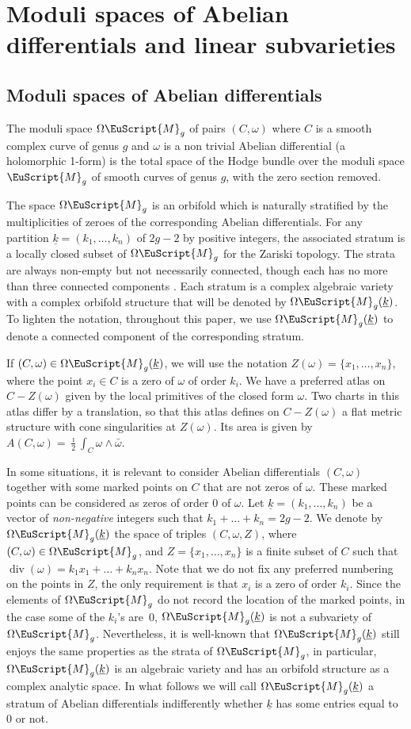 \documentclass[10pt]{amsart}
\let\mathcal\EuScript
\DeclareMathOperator{\Div}{div}
\theoremstyle{plain}
\theoremstyle{definition}
\newcommand{\Mcal}{\mathcal{M}}
\newcommand{\cM}{\mathcal{M}}
\let\omg\omega
\let\ul\underline
\newcommand{\trate}{\Omega\Mcal_{g}(\ul{k})}
\newcommand{\htrate}{\Omega\Mcal_{g}}
\begin{document}
\section{Moduli spaces of Abelian differentials and linear subvarieties}\label{sec:strate:n:lin:subvar}
\subsection{Moduli spaces of Abelian differentials}\label{subsec:strate:abel}
The moduli space $\htrate$ of pairs $(C, \omega)$ where $C$ is a smooth complex curve of genus $g$ and $\omega$ is a non trivial Abelian differential (\ie a holomorphic 1-form) is the total space of the Hodge bundle over the moduli space $\cM_g$ of smooth curves of genus $g$, with the zero section removed.

The space $\htrate$ is an orbifold which is naturally stratified by the multiplicities of zeroes of the corresponding Abelian differentials. For any partition $\underline k=(k_1,\dots,k_n)$ of $ 2g - 2$ by positive integers, the associated stratum is a locally closed subset of $\htrate$ for the Zariski topology. The strata are always non-empty but not necessarily connected, though each has no more than three connected components \cite{KZ03}. Each stratum is a complex algebraic variety with a complex orbifold structure that will be denoted by $\trate$. To lighten the notation, throughout this paper, we use $\trate$ to denote a connected component of the corresponding stratum.

If $(C,\omega)\in\trate$, we will use the notation $Z(\omega)=\{x_1,\dots,x_n\}$, where the point $x_i\in C$ is a zero of $\omega$ of order $k_i$. We have a preferred atlas on $C - Z(\omega)$ given by the local primitives of the closed form $\omega$. Two charts in this atlas differ by a translation, so that this atlas defines on $C - Z(\omega)$ a flat metric structure with cone singularities at $Z(\omega)$. Its area is given by $A(C, \omega) = \frac{\imath}{2} \int_C \omega \wedge \bar \omega$.

In some situations, it is relevant to consider Abelian differentials $(C,\omg)$ together with some marked points on $C$ that are not zeros of $\omg$. These marked points can be considered as zeros of order $0$ of $\omg$. Let $\ul{k}=(k_1,\dots,k_n)$ be a vector of \emph{non-negative} integers such that $k_1+\dots+k_n=2g-2$. We denote by $\trate$ the space of triples $(C,\omg,Z)$, where $(C,\omg)\in \htrate$, and $Z=\{x_1,\dots,x_n\}$ is a finite subset of $C$ such that $\Div(\omg)=k_1x_1+\dots+k_nx_n$. Note that we do not fix any preferred numbering on the points in $Z$, the only requirement is that $x_i$ is a zero of order $k_i$.
Since the elements of $\htrate$ do not record the location of the marked points, in the case some of the $k_i$'s are~$0$, $\trate$ is not a subvariety of $\htrate$.
Nevertheless, it is well-known that $\trate$ still enjoys the same properties as the strata of $\htrate$, in particular, $\trate$ is an algebraic variety and has an orbifold structure as a complex analytic space.
In what follows we will call $\trate$ a stratum of Abelian differentials indifferently whether $\ul{k}$ has some entries equal to $0$ or not.\enlargethispage{.5\baselineskip}%
\end{document}
